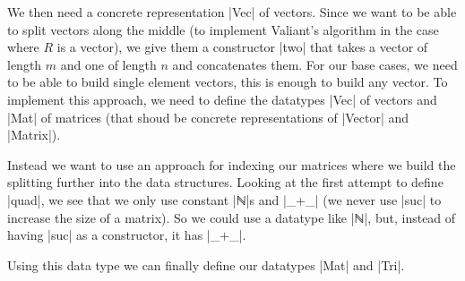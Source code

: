 We then need a concrete representation |Vec| of vectors. Since we want to be able to split vectors along the middle (to implement Valiant's algorithm in the case where $R$ is a vector), we give them a constructor |two| that takes a vector of length $m$ and one of length $n$ and concatenates them. For our base cases, we need to be able to build single element vectors, this is enough to build any vector.
To implement this approach, we need to define the datatypes |Vec| of vectors and |Mat| of matrices (that shoud be concrete representations of |Vector| and |Matrix|).


Instead we want to use an approach for indexing our matrices where we build the splitting further into the data structures. Looking at the first attempt to define |quad|, we see that we only use constant |ℕ|s and |_+_| (we never use |suc| to increase the size of a matrix). So we could use a datatype like |ℕ|, but, instead of having |suc| as a constructor, it has |_+_|.

Using this data type we can finally define our datatypes |Mat| and |Tri|.


